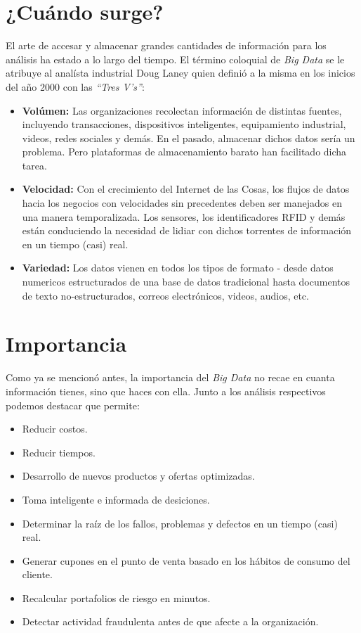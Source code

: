 \documentclass[letterpaper, 12pt]{article}
\begin{document}
    \section*{¿Cuándo surge?}
    \justify
    El arte de accesar y almacenar grandes cantidades de información para los análisis ha estado a lo largo del tiempo. El término coloquial de \emph{Big Data} se le atribuye al 
    analísta industrial Doug Laney quien definió a la misma en los inicios del año 2000 con las \emph{``Tres V's''}:
    \begin{itemize}
        \item \textbf{Volúmen: }Las organizaciones recolectan información de distintas fuentes, incluyendo transacciones, dispositivos inteligentes, equipamiento industrial, videos, redes sociales y demás.
        En el pasado, almacenar dichos datos sería un problema. Pero plataformas de almacenamiento barato han facilitado dicha tarea.
        \item \textbf{Velocidad: }Con el crecimiento del Internet de las Cosas, los flujos de datos hacia los negocios con velocidades sin precedentes deben ser manejados en una manera temporalizada. Los sensores,
        los identificadores RFID y demás están conduciendo la necesidad de lidiar con dichos torrentes de información en un tiempo (casi) real.
        \item \textbf{Variedad: }Los datos vienen en todos los tipos de formato - desde datos numericos estructurados de una base de datos tradicional hasta documentos de texto no-estructurados, correos electrónicos,
        videos, audios, etc.
    \end{itemize}
    \section*{Importancia}
    \justify
    Como ya se mencionó antes, la importancia del \emph{Big Data} no recae en cuanta información tienes, sino que haces con ella. Junto a los análisis respectivos podemos destacar que permite:
    \begin{itemize}
        \item Reducir costos.
        \item Reducir tiempos.
        \item Desarrollo de nuevos productos y ofertas optimizadas.
        \item Toma inteligente e informada de desiciones.
        \item Determinar la raíz de los fallos, problemas y defectos en un tiempo (casi) real.
        \item Generar cupones en el punto de venta basado en los hábitos de consumo del cliente.
        \item Recalcular portafolios de riesgo en minutos.
        \item Detectar actividad fraudulenta antes de que afecte a la organización.
    \end{itemize}
\end{document}
